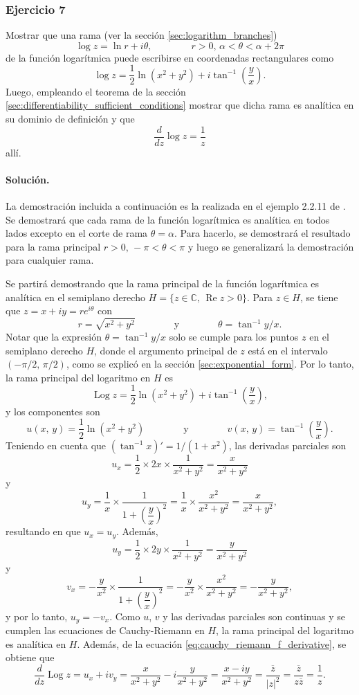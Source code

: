 \documentclass[a4paper]{report}
\renewcommand{\Re}{\operatorname{Re}}
\DeclareMathOperator{\Log}{Log}
\begin{document}
\subsubsection{Ejercicio 7}

Mostrar que una rama (ver la sección \ref{sec:logarithm_branches})
\[
 \log z=\ln r+i\theta,\qquad\qquad
 r>0,\,\alpha<\theta<\alpha+2\pi
\]
de la función logarítmica puede escribirse en coordenadas rectangulares como 
\[
 \log z=\frac{1}{2}\ln(x^2+y^2)+i\tan^{-1}\left(\frac{y}{x}\right).
\]
Luego, empleando el teorema de la sección \ref{sec:differentiability_sufficient_conditions} mostrar que dicha rama es analítica en su dominio de definición y que  
\[
 \frac{d}{dz}\log z=\frac{1}{z}
\]
allí.

\paragraph{Solución.} La demostración incluida a continuación es la realizada en el ejemplo 2.2.11 de \cite{taylor2011complex}. Se demostrará que cada rama de la función logarítmica es analítica en todos lados excepto en el corte de rama \(\theta=\alpha\). Para hacerlo, se demostrará el resultado para la rama principal \(r>0,\,-\pi<\theta<\pi\) y luego se generalizará la demostración para cualquier rama.

Se partirá demostrando que la rama principal de la función logarítmica es analítica en el semiplano derecho \(H=\{z\in\mathbb{C},\,\Re z>0\}\). Para \(z\in H\), se tiene que \(z=x+iy=re^{i\theta}\) con 
\[
 r=\sqrt{x^2+y^2}
 \qquad\qquad\textrm{y}\qquad\qquad
 \theta=\tan^{-1}y/x.
\]
Notar que la expresión \(\theta=\tan^{-1}y/x\) solo se cumple para los puntos \(z\) en el semiplano derecho \(H\), donde el argumento principal de \(z\) está en el intervalo \((-\pi/2,\,\pi/2)\), como se explicó en la sección \ref{sec:exponential_form}. Por lo tanto, la rama principal del logaritmo en \(H\) es
\[
 \Log z=\frac{1}{2}\ln(x^2+y^2)+i\tan^{-1}\left(\frac{y}{x}\right),
\]
y los componentes son 
\[
 u(x,\,y)=\frac{1}{2}\ln(x^2+y^2)
 \qquad\qquad\textrm{y}\qquad\qquad
 v(x,\,y)=\tan^{-1}\left(\frac{y}{x}\right).
\]
Teniendo en cuenta que \((\tan^{-1}x)'=1/(1+x^2)\), las derivadas parciales son
\[
 u_x=\frac{1}{2}\times2x\times\frac{1}{x^2+y^2}=\frac{x}{x^2+y^2}
\]
y
\[
 u_y=\frac{1}{x}\times\dfrac{1}{1+\left(\dfrac{y}{x}\right)^2}=\frac{1}{x}\times\frac{x^2}{x^2+y^2}=\frac{x}{x^2+y^2},
\]
resultando en que \(u_x=u_y\). Además,
\[
 u_y=\frac{1}{2}\times2y\times\frac{1}{x^2+y^2}=\frac{y}{x^2+y^2}
\]
y
\[
 v_x=-\frac{y}{x^2}\times\dfrac{1}{1+\left(\dfrac{y}{x}\right)^2}=-\frac{y}{x^2}\times\frac{x^2}{x^2+y^2}=-\frac{y}{x^2+y^2},
\]
y por lo tanto, \(u_y=-v_x\). Como \(u\), \(v\) y las derivadas parciales son continuas y se cumplen las ecuaciones de Cauchy-Riemann en \(H\), la rama principal del logaritmo es analítica en \(H\). Además, de la ecuación \ref{eq:cauchy_riemann_f_derivative}, se obtiene que 
\[
 \frac{d}{dz}\Log z=u_x+iv_y=\frac{x}{x^2+y^2}-i\frac{y}{x^2+y^2}=\frac{x-iy}{x^2+y^2}=\frac{\overline{z}}{|z|^2}=\frac{\overline{z}}{z\overline{z}}=\frac{1}{z}.
\]
\end{document}
